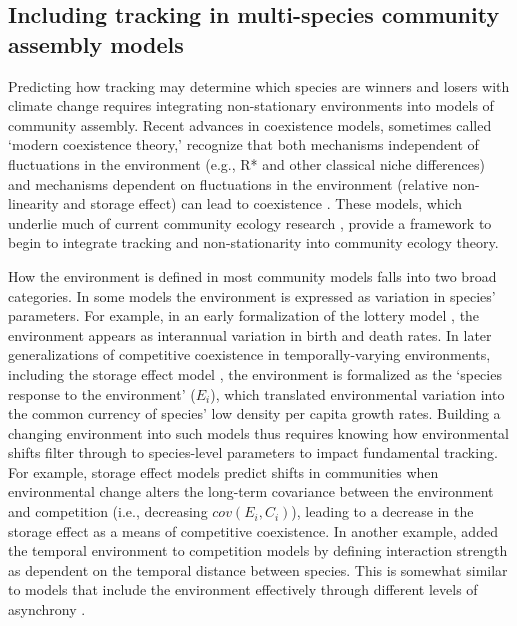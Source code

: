 \documentclass[11pt,letterpaper]{article}
\begin{document}
\subsection{Including tracking in multi-species community assembly models} 
Predicting how tracking may determine which species are winners and losers with climate change requires integrating non-stationary environments into models of community assembly. Recent advances in coexistence models, sometimes called `modern coexistence theory,' recognize that both mechanisms independent of fluctuations in the environment (e.g., R* and other classical niche differences) and mechanisms dependent on fluctuations in the environment (relative non-linearity and storage effect) can lead to coexistence \citep{Chesson:1997dz,Chesson:2000vd}. These models, which underlie much of current community ecology research \citep{Mayfield:2010fe,barabas2018,ellner2019}, provide a framework to begin to integrate tracking and non-stationarity into community ecology theory.

How the environment is defined in most community models falls into two broad categories. In some models the environment is expressed as variation in species' parameters. For example, in an early formalization of the lottery model \citep{chesson1981}, the environment appears as interannual variation in birth and death rates.  In later generalizations of competitive coexistence in temporally-varying environments, including the storage effect model \citep{Chesson:1997dz}, the environment is formalized as the `species response to the environment' ($E_i$), which translated environmental variation into the common currency of species' low density per capita growth rates. Building a changing environment into such models thus requires knowing how environmental shifts filter through to species-level parameters \citep{Tuljapurkar2009} to impact fundamental tracking. For example, storage effect models predict shifts in communities when environmental change alters the long-term covariance between the environment and competition (i.e., decreasing $cov(E_i, C_i)$), leading to a decrease in the storage effect as a means of competitive coexistence. In another example, \citet{volkerass} added the temporal environment to competition models by defining interaction strength as dependent on the temporal distance between species. This is somewhat similar to models that include the environment effectively through different levels of asynchrony \citep[e.g.,][]{Nakazawa2012,revilla2014}. 
\end{document}
